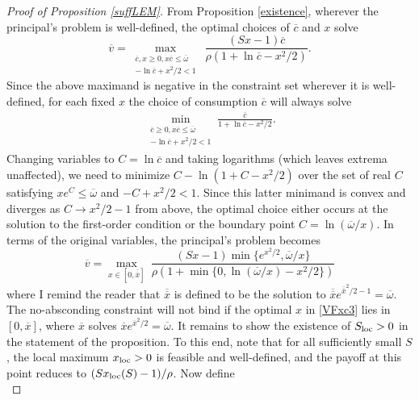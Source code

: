 \documentclass[11pt]{article}
\theoremstyle{plain}
\theoremstyle{definition} %
\begin{document}
\begin{proof}[Proof of Proposition \ref{suffLEM}]
From Proposition \ref{existence}, wherever the principal's problem is well-defined, the optimal choices of $\overline{c}$ and $x$ solve
\begin{equation}
\overline{v} = \max_{\substack{\overline{c},x\geq 0, x\overline{c} \leq \overline{\omega} \\ -\ln \overline{c} + x^2/2<1}} \ \frac{(Sx - 1)\overline{c}}{\rho(1 + \ln \overline{c} - x^2/2)}.
\label{VFxc2}
\end{equation}
Since the above maximand is negative in the constraint set wherever it is well-defined, for each fixed $x$ the choice of consumption $\overline{c}$ will always solve
\begin{align*}
\min_{\substack{\overline{c} \geq 0, x\overline{c} \leq \overline{\omega} \\ -\ln \overline{c} + x^2/2<1}} \frac{\overline{c}}{1 + \ln \overline{c} - x^2/2}.
\end{align*}
Changing variables to $C = \ln \overline{c}$ and taking logarithms (which leaves extrema unaffected), we need to minimize $C - \ln(1 + C - x^2/2)$ over the set of real $C$ satisfying $xe^C \leq \overline{\omega}$ and $-C + x^2/2<1$. Since this latter minimand is convex and diverges as $C \rightarrow x^2/2-1$ from above, the optimal choice either occurs at the solution to the first-order condition or the boundary point $C = \ln(\overline{\omega}/x)$. In terms of the original variables, the principal's problem becomes
\begin{equation}
\overline{v} = \max_{x \in [0, \overline{\overline{x}}]} \ \frac{(Sx - 1)\min\{e^{x^2/2},\overline{\omega}/x\}}{\rho(1 + \min\{0,\ln (\overline{\omega}/x) - x^2/2\})}
\label{VFxc3}
\end{equation}
where I remind the reader that $\overline{\overline{x}}$ is defined to be the solution to $\overline{\overline{x}}e^{\overline{\overline{x}}^2/2-1} = \overline{\omega}$. The no-absconding constraint will not bind if the optimal $x$ in \eqref{VFxc3} lies in $[0, \overline{x}]$, where $\overline{x}$ solves $\overline{x}e^{\overline{x}^2/2} = \overline{\omega}$. It remains to show the existence of $S_{\textnormal{loc}} > 0$ in the statement of the proposition. To this end, note that for all sufficiently small $S$, the local maximum $x_{\textnormal{loc}} > 0$ is feasible and well-defined, and the payoff at this point reduces to $(Sx_{\textnormal{loc}}(S) - 1)/\rho$. Now define
\begin{equation}

\end{equation}
\end{proof}
\end{document}
